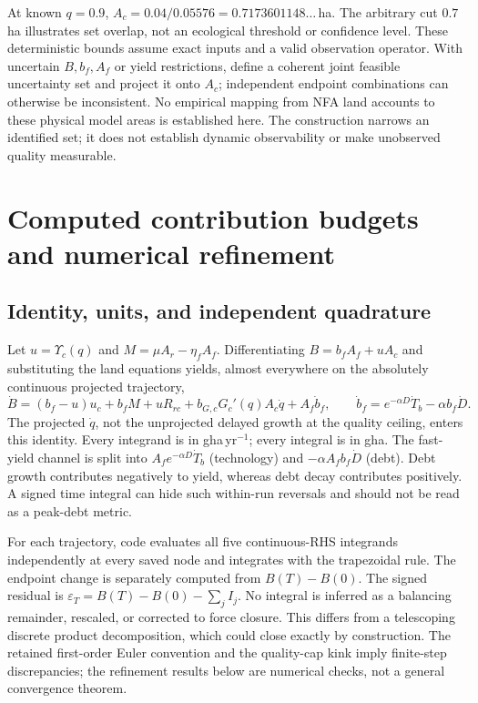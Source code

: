 \documentclass[11pt,a4paper]{article}
\newcommand{\Ups}{\Upsilon_c}
\begin{document}
At known $q=0.9$, $A_c=0.04/0.05576=0.7173601148\ldots$\,ha. The arbitrary cut $0.7$\,ha illustrates set overlap, not an ecological threshold or confidence level. These deterministic bounds assume exact inputs and a valid observation operator. With uncertain $B,b_f,A_f$ or yield restrictions, define a coherent joint feasible uncertainty set and project it onto $A_c$; independent endpoint combinations can otherwise be inconsistent. No empirical mapping from NFA land accounts to these physical model areas is established here. The construction narrows an identified set; it does not establish dynamic observability or make unobserved quality measurable.

\section{Computed contribution budgets and numerical refinement}\label{si:c13budget}

\subsection{Identity, units, and independent quadrature}

Let $u=\Ups(q)$ and $M=\mu A_r-\eta_fA_f$. Differentiating $B=b_fA_f+uA_c$ and substituting the land equations yields, almost everywhere on the absolutely continuous projected trajectory,
\[
\dot B=(b_f-u)u_c+b_fM+uR_{rc}+b_{G,c}G_c'(q)A_c\dot q+A_f\dot b_f,
\qquad
\dot b_f=e^{-\alpha D}\dot T_b-\alpha b_f\dot D.
\]
The projected $\dot q$, not the unprojected delayed growth at the quality ceiling, enters this identity. Every integrand is in gha\,yr$^{-1}$; every integral is in gha. The fast-yield channel is split into $A_fe^{-\alpha D}\dot T_b$ (technology) and $-\alpha A_fb_f\dot D$ (debt). Debt growth contributes negatively to yield, whereas debt decay contributes positively. A signed time integral can hide such within-run reversals and should not be read as a peak-debt metric.

For each trajectory, code evaluates all five continuous-RHS integrands independently at every saved node and integrates with the trapezoidal rule. The endpoint change is separately computed from $B(T)-B(0)$. The signed residual is $\varepsilon_T=B(T)-B(0)-\sum_j I_j$. No integral is inferred as a balancing remainder, rescaled, or corrected to force closure. This differs from a telescoping discrete product decomposition, which could close exactly by construction. The retained first-order Euler convention and the quality-cap kink imply finite-step discrepancies; the refinement results below are numerical checks, not a general convergence theorem.
\end{document}
